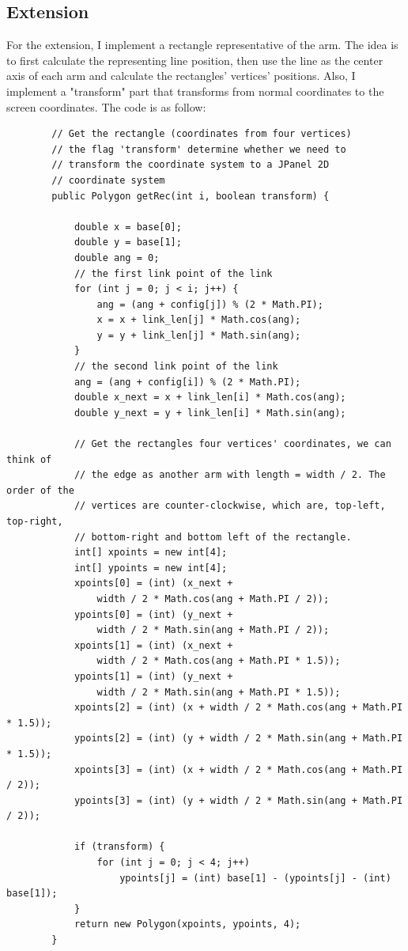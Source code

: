 \documentclass{article}
\begin{document}
\subsection{Extension}
For the extension, I implement a rectangle representative of the arm. The idea is to first calculate the representing line position, then use the line as the center axis of each arm and calculate the rectangles' vertices' positions. Also, I implement a "transform" part that transforms from normal coordinates to the screen coordinates. The code is as follow:
\begin{lstlisting}
		// Get the rectangle (coordinates from four vertices)
		// the flag 'transform' determine whether we need to
		// transform the coordinate system to a JPanel 2D
		// coordinate system
		public Polygon getRec(int i, boolean transform) {

			double x = base[0];
			double y = base[1];
			double ang = 0;
			// the first link point of the link
			for (int j = 0; j < i; j++) {
				ang = (ang + config[j]) % (2 * Math.PI);
				x = x + link_len[j] * Math.cos(ang);
				y = y + link_len[j] * Math.sin(ang);
			}
			// the second link point of the link
			ang = (ang + config[i]) % (2 * Math.PI);
			double x_next = x + link_len[i] * Math.cos(ang);
			double y_next = y + link_len[i] * Math.sin(ang);

			// Get the rectangles four vertices' coordinates, we can think of
			// the edge as another arm with length = width / 2. The order of the
			// vertices are counter-clockwise, which are, top-left, top-right,
			// bottom-right and bottom left of the rectangle.
			int[] xpoints = new int[4];
			int[] ypoints = new int[4];
			xpoints[0] = (int) (x_next +
			 	width / 2 * Math.cos(ang + Math.PI / 2));
			ypoints[0] = (int) (y_next + 
				width / 2 * Math.sin(ang + Math.PI / 2));
			xpoints[1] = (int) (x_next + 
				width / 2 * Math.cos(ang + Math.PI * 1.5));
			ypoints[1] = (int) (y_next + 
				width / 2 * Math.sin(ang + Math.PI * 1.5));
			xpoints[2] = (int) (x + width / 2 * Math.cos(ang + Math.PI * 1.5));
			ypoints[2] = (int) (y + width / 2 * Math.sin(ang + Math.PI * 1.5));
			xpoints[3] = (int) (x + width / 2 * Math.cos(ang + Math.PI / 2));
			ypoints[3] = (int) (y + width / 2 * Math.sin(ang + Math.PI / 2));

			if (transform) {
				for (int j = 0; j < 4; j++)
					ypoints[j] = (int) base[1] - (ypoints[j] - (int) base[1]);
			}
			return new Polygon(xpoints, ypoints, 4);
		}
\end{lstlisting}
\end{document}
